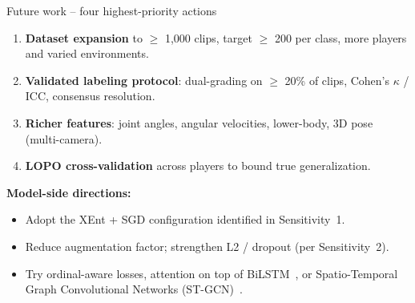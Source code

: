 \begin{frame}{Future work -- four highest-priority actions}
\hypertarget{sub:future}{}%
\begin{enumerate}\small
    \item \textbf{Dataset expansion} to $\geq$ 1{,}000 clips, target $\geq$ 200 per class, more players and varied environments.
    \item \textbf{Validated labeling protocol}: dual-grading on $\geq$ 20\% of clips, Cohen's $\kappa$ / ICC, consensus resolution.
    \item \textbf{Richer features}: joint angles, angular velocities, lower-body, 3D pose (multi-camera).
    \item \textbf{LOPO cross-validation} across players to bound true generalization.
\end{enumerate}
\vspace{6pt}
\textbf{\color{tecdark}Model-side directions:}
\begin{itemize}\small
    \item Adopt the \alert{XEnt + SGD} configuration identified in Sensitivity~1.
    \item Reduce augmentation factor; strengthen L2 / dropout (per Sensitivity~2).
    \item Try ordinal-aware losses, attention on top of BiLSTM~\cite{Vaswani2017Attention}, or Spatio-Temporal Graph Convolutional Networks (ST-GCN)~\cite{Yan2018STGCN}.
\end{itemize}
\end{frame}

